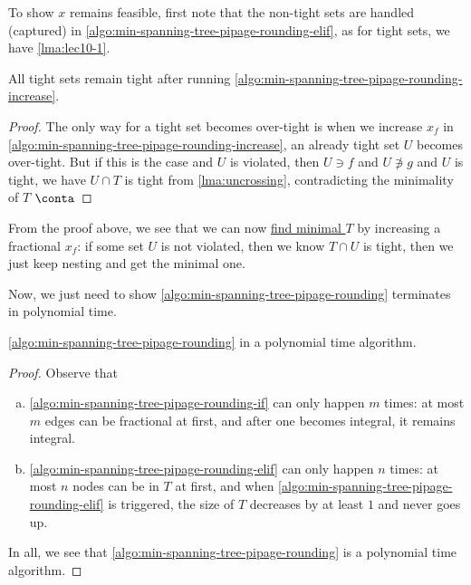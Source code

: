 To show \(x\) remains feasible, first note that the non-tight sets are handled (captured) in \autoref{algo:min-spanning-tree-pipage-rounding-elif}, as for tight sets, we have \autoref{lma:lec10-1}.

\begin{lemma}\label{lma:lec10-1}
	All tight sets remain tight after running \autoref{algo:min-spanning-tree-pipage-rounding-increase}.
\end{lemma}
\begin{proof}
	The only way for a tight set becomes over-tight is when we increase \(x_f\) in \autoref{algo:min-spanning-tree-pipage-rounding-increase}, an already tight set \(U\) becomes over-tight. But if this is the case and \(U\) is violated, then \(U\ni f\) and \(U\not\ni g\) and \(U\) is tight, we have \(U \cap T\) is tight from \autoref{lma:uncrossing}, contradicting the minimality of \(T\) \(\conta\)
\end{proof}

\begin{remark}\label{rmk:lec10-1}
	From the proof above, we see that we can now \hyperref[algo:min-spanning-tree-pipage-rounding-min-tight-set]{find minimal \(T\)} by increasing a fractional \(x_f\): if some set \(U\) is not violated, then we know \(T \cap U\) is tight, then we just keep nesting and get the minimal one.
\end{remark}

Now, we just need to show \autoref{algo:min-spanning-tree-pipage-rounding} terminates in polynomial time.

\begin{lemma}\label{lma:lec10-2}
	\autoref{algo:min-spanning-tree-pipage-rounding} in a polynomial time algorithm.
\end{lemma}
\begin{proof}
	Observe that
	\begin{enumerate}[(a)]
		\item \autoref{algo:min-spanning-tree-pipage-rounding-if} can only happen \(m\) times: at most \(m\) edges can be fractional at first, and after one becomes integral, it remains integral.
		\item \autoref{algo:min-spanning-tree-pipage-rounding-elif} can only happen \(n\) times: at most \(n\) nodes can be in \(T\) at first, and when \autoref{algo:min-spanning-tree-pipage-rounding-elif} is triggered, the size of \(T\) decreases by at least \(1\) and never goes up.
	\end{enumerate}
	In all, we see that \autoref{algo:min-spanning-tree-pipage-rounding} is a polynomial time algorithm.
\end{proof}

